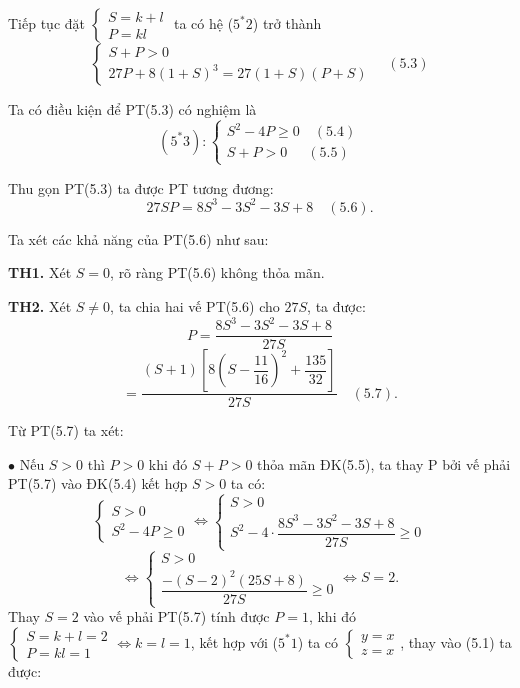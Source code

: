 \documentclass[12pt]{report}
\begin{document}
\vspace{0.2cm}
\noindent Tiếp tục đặt $\begin{cases} S = k + l \\ P = kl \end{cases}$ ta có hệ ($5^*2$) trở thành
\[
\begin{cases}
S + P > 0 \\
27P + 8(1 + S)^3 = 27(1 + S)(P + S)
\end{cases} \quad (5.3)
\]

\noindent Ta có điều kiện để PT(5.3) có nghiệm là
\[
(5^*3): \begin{cases} S^2 - 4P \geq 0 \quad (5.4) \\ S + P > 0 \quad\ \ (5.5) \end{cases}
\]

\noindent Thu gọn PT(5.3) ta được PT tương đương:
\[
27SP = 8S^3 - 3S^2 - 3S + 8 \quad (5.6).
\]

\noindent Ta xét các khả năng của PT(5.6) như sau:

\vspace{0.2cm}
\noindent \textbf{TH1.} Xét $S = 0$, rõ ràng PT(5.6) không thỏa mãn.

\vspace{0.2cm}
\noindent \textbf{TH2.} Xét $S \neq 0$, ta chia hai vế PT(5.6) cho $27S$, ta được:
\[
P = \dfrac{8S^3 - 3S^2 - 3S + 8}{27S}
\]
\[
= \dfrac{(S + 1) \left[ 8\left(S - \dfrac{11}{16}\right)^2 + \dfrac{135}{32} \right]}{27S} \quad (5.7).
\]

\noindent Từ PT(5.7) ta xét:

\vspace{0.2cm}
\noindent $\bullet$ Nếu $S > 0$ thì $P > 0$ khi đó $S + P > 0$ thỏa mãn ĐK(5.5), ta thay P bởi vế phải PT(5.7) vào ĐK(5.4) kết hợp $S > 0$ ta có:
\[
\begin{cases} S > 0 \\ S^2 - 4P \geq 0 \end{cases} \Leftrightarrow \begin{cases} S > 0 \\ S^2 - 4 \cdot \dfrac{8S^3 - 3S^2 - 3S + 8}{27S} \geq 0 \end{cases}
\]
\[
\Leftrightarrow \begin{cases} S > 0 \\ \dfrac{-(S - 2)^2(25S + 8)}{27S} \geq 0 \end{cases} \Leftrightarrow S = 2.
\]
\noindent Thay $S = 2$ vào vế phải PT(5.7) tính được $P = 1$, khi đó $\begin{cases} S = k + l = 2 \\ P = kl = 1 \end{cases} \Leftrightarrow k = l = 1$, kết hợp với ($5^*1$) ta có $\begin{cases} y = x \\ z = x \end{cases}$, thay vào (5.1) ta được:
\end{document}
